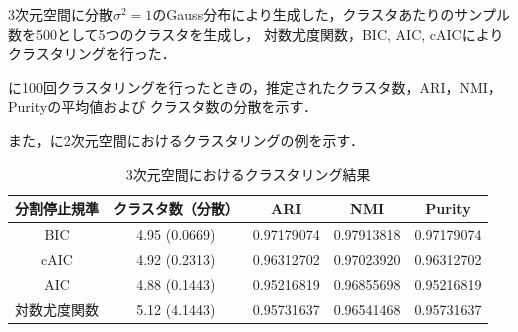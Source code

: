 3次元空間に分散$\sigma^2=1$のGauss分布により生成した，クラスタあたりのサンプル数を500として5つのクラスタを生成し，
対数尤度関数，BIC, AIC, cAICによりクラスタリングを行った．

に100回クラスタリングを行ったときの，推定されたクラスタ数，ARI，NMI，Purityの平均値および
クラスタ数の分散を示す．

また，に2次元空間におけるクラスタリングの例を示す．

\begin{table}[htb]
  \centering
  \caption{3次元空間におけるクラスタリング結果}
  \label{table:3dim}
  \begin{tabular}{|c|c|c|c|c|} \hline
    分割停止規準 & クラスタ数（分散） & ARI & NMI & Purity \\\hline
    BIC & 4.95 (0.0669) & 0.97179074 & 0.97913818 & 0.97179074\\
    cAIC & 4.92 (0.2313) & 0.96312702 & 0.97023920 & 0.96312702\\
    AIC & 4.88 (0.1443) & 0.95216819 & 0.96855698 & 0.95216819\\
    対数尤度関数 & 5.12 (4.1443) & 0.95731637 & 0.96541468 & 0.95731637\\\hline 
  \end{tabular}
\end{table}
